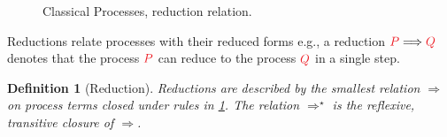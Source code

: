 \documentclass[draft,submission,copyright,creativecommons]{eptcs}
\makeatletter
\newtheorem{definition}{Definition}
\renewcommand*{\eg}{e.g.\@\xspace}
\makeatother
\begin{document}
\begin{figure}[htb]
\begin{center}
    \begin{prooftree*}
      \SYM{\cpRedGammaCut}
    \end{prooftree*}
    \begin{prooftree*}
      \SYM{\cpRedGammaEquiv}
    \end{prooftree*}
  \end{center}
  \caption{Classical Processes, reduction relation.}
  \label{fig:cp-reduction}
\end{figure}
Reductions relate processes with their reduced forms \eg, a reduction
$\reducesto{P}{Q}$ denotes that the process $\tm{P}$ can reduce to the process
$\tm{Q}$ in a single step.
\begin{definition}[Reduction]\label{def:cp-reduction}
  Reductions are described by the smallest relation $\Longrightarrow$ on process
  terms closed under rules in \cref{fig:cp-reduction}.
  The relation $\Longrightarrow^\star$ is the reflexive, transitive closure of 
  $\Longrightarrow$.
\end{definition}
\end{document}
